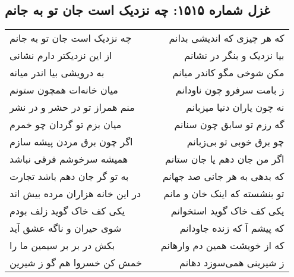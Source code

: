 \begin{center}
\section*{غزل شماره ۱۵۱۵: چه نزدیک است جان تو به جانم}
\label{sec:1515}
\begin{longtable}{l p{0.5cm} r}
چه نزدیک است جان تو به جانم
&&
که هر چیزی که اندیشی بدانم
\\
از این نزدیکتر دارم نشانی
&&
بیا نزدیک و بنگر در نشانم
\\
به درویشی بیا اندر میانه
&&
مکن شوخی مگو کاندر میانم
\\
میان خانه‌ات همچون ستونم
&&
ز بامت سرفرو چون ناودانم
\\
منم همراز تو در حشر و در نشر
&&
نه چون یاران دنیا میزبانم
\\
میان بزم تو گردان چو خمرم
&&
گه رزم تو سابق چون سنانم
\\
اگر چون برق مردن پیشه سازم
&&
چو برق خوبی تو بی‌زبانم
\\
همیشه سرخوشم فرقی نباشد
&&
اگر من جان دهم یا جان ستانم
\\
به تو گر جان دهم باشد تجارت
&&
که بدهی به هر جانی صد جهانم
\\
در این خانه هزاران مرده بیش اند
&&
تو بنشسته که اینک خان و مانم
\\
یکی کف خاک گوید زلف بودم
&&
یکی کف خاک گوید استخوانم
\\
شوی حیران و ناگه عشق آید
&&
که پیشم آ که زنده جاودانم
\\
بکش در بر بر سیمین ما را
&&
که از خویشت همین دم وارهانم
\\
خمش کن خسروا هم گو ز شیرین
&&
ز شیرینی همی‌سوزد دهانم
\\
\end{longtable}
\end{center}
